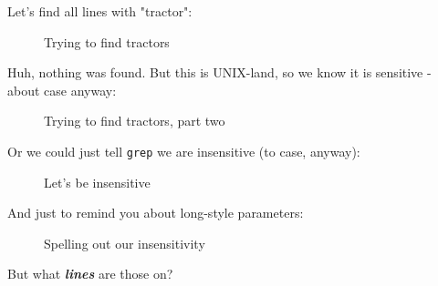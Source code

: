 \documentclass[10pt,american,]{book}
\newenvironment{Shaded}{\begin{snugshade}}{\end{snugshade}}
\newcommand{\KeywordTok}[1]{\textcolor[rgb]{0.13,0.29,0.53}{\textbf{{#1}}}}
\newcommand{\NormalTok}[1]{{#1}}
\numberwithin{figure}{chapter}
\DeclareRobustCommand{\drcap}[1]{\begin{figure}[H]\caption{#1}\end{figure}}
\renewcommand{\KeywordTok}[1]{{#1}}
\renewcommand{\NormalTok}[1]{{#1}}
\begin{document}
Let's find all lines with "tractor":

\drcap{Trying to find tractors}

\begin{Shaded}
\end{Shaded}

Huh, nothing was found. But this is UNIX-land, so we know it is
sensitive - about case anyway:

\drcap{Trying to find tractors, part two}

\begin{Shaded}
\end{Shaded}

Or we could just tell \texttt{grep} we are insensitive (to case,
anyway):

\drcap{Let's be insensitive}

\begin{Shaded}
\end{Shaded}

And just to remind you about long-style parameters:

\drcap{Spelling out our insensitivity}

\begin{Shaded}
\end{Shaded}

But what \textbf{\emph{lines}} are those on?
\end{document}
